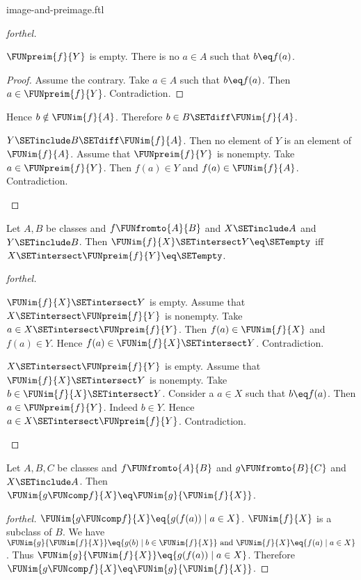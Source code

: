 \documentclass{naproche-library}
\begin{document}
\begin{smodule}[title=Computation Laws for Images and Preimages]{image-and-preimage.ftl}
\begin{proof}[forthel]
\begin{case}{$\FUNpreim{f}{Y}$ is empty.}
    There is no $a \in A$ such that $b \eq f(a)$.
    \begin{proof}
      Assume the contrary.
      Take $a \in A$ such that $b \eq f(a)$.
      Then $a \in \FUNpreim{f}{Y}$.
      Contradiction.
    \end{proof}

    Hence $b \notin \FUNim{f}{A}$.
    Therefore $b \in B \SETdiff \FUNim{f}{A}$.
  \end{case}

  \begin{case}{$Y \SETinclude B \SETdiff \FUNim{f}{A}$.}
    Then no element of $Y$ is an element of $\FUNim{f}{A}$.
    Assume that $\FUNpreim{f}{Y}$ is nonempty.
    Take $a \in \FUNpreim{f}{Y}$.
    Then $f(a) \in Y$ and $f(a) \in \FUNim{f}{A}$.
    Contradiction.
  \end{case}
\end{proof}

\begin{proposition}[forthel,id=FOUNDATIONS_07_6295504988143616]
  Let $A, B$ be classes and $f \FUNfromto{A}{B}$ and $X \SETinclude A$ and $Y \SETinclude B$.
  Then $\FUNim{f}{X} \SETintersect Y \eq \SETempty$ iff $X \SETintersect \FUNpreim{f}{Y} \eq \SETempty$.
\end{proposition}
\begin{proof}[forthel]
  \begin{case}{$\FUNim{f}{X} \SETintersect Y$ is empty.}
    Assume that $X \SETintersect \FUNpreim{f}{Y}$ is nonempty.
    Take $a \in X \SETintersect \FUNpreim{f}{Y}$.
    Then $f(a) \in \FUNim{f}{X}$ and $f(a) \in Y$.
    Hence $f(a) \in \FUNim{f}{X} \SETintersect Y$.
    Contradiction.
  \end{case}

  \begin{case}{$X \SETintersect \FUNpreim{f}{Y}$ is empty.}
    Assume that $\FUNim{f}{X} \SETintersect Y$ is nonempty.
    Take $b \in \FUNim{f}{X} \SETintersect Y$.
    Consider a $a \in X$ such that $b \eq f(a)$.
    Then $a \in \FUNpreim{f}{Y}$.
    Indeed $b \in Y$.
    Hence $a \in X \SETintersect \FUNpreim{f}{Y}$.
    Contradiction.
  \end{case}
\end{proof}

\begin{proposition}[forthel,id=FOUNDATIONS_07_5628919411638272]
  Let $A, B, C$ be classes and $f \FUNfromto{A}{B}$ and $g \FUNfromto{B}{C}$ and $X \SETinclude A$.
  Then $\FUNim{g \FUNcomp f}{X} \eq \FUNim{g}{\FUNim{f}{X}}$.
\end{proposition}
\begin{proof}[forthel]
  $\FUNim{g \FUNcomp f}{X} \eq \{ g(f(a)) \mid a \in X \}$.
  $\FUNim{f}{X}$ is a subclass of $B$.
  We have $\FUNim{g}{\FUNim{f}{X}} \eq \{ g(b) \mid b \in \FUNim{f}{X} \}\text{ and }\FUNim{f}{X} \eq \{ f(a) \mid a \in X \}$.
  Thus $\FUNim{g}{\FUNim{f}{X}} \eq \{ g(f(a)) \mid a \in X \}$.
  Therefore $\FUNim{g \FUNcomp f}{X} \eq \FUNim{g}{\FUNim{f}{X}}$.
\end{proof}


\end{smodule}
\end{document}
